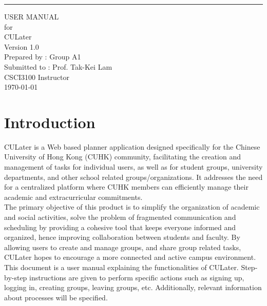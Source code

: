 \documentclass{scrreprt}
\date{}
\def\myversion{1.0 }
\begin{document}
\begin{flushright}
    \rule{16cm}{5pt}\vskip1cm
    \begin{bfseries}
        \Huge{USER MANUAL}\\
        \vspace{1.5cm}
        for\\
        \vspace{1.5cm}
        CULater\\
        \vspace{1.5cm}
        \LARGE{Version \myversion}\\
        \vspace{1.5cm}
        Prepared by : Group A1\\
        \vspace{1.5cm}
        Submitted to : Prof. Tak-Kei Lam\\CSCI3100 Instructor\\
        \vspace{1.5cm}
        \today\\
    \end{bfseries}
\end{flushright}

\newpage
\tableofcontents
\newpage
\chapter{Introduction}

CULater is a Web based planner application designed specifically for the Chinese University of Hong Kong (CUHK) community, facilitating the creation and management of tasks for individual users, as well as for student groups, university departments, and other school related groups/organizations. It addresses the need for a centralized platform where CUHK members can efficiently manage their academic and extracurricular commitments.\\

The primary objective of this product is to simplify the organization of academic and social activities, solve the problem of fragmented communication and scheduling by providing a cohesive tool that keeps everyone informed and organized, hence improving collaboration between students and faculty. By allowing users to create and manage groups, and share group related tasks, CULater hopes to encourage a more connected and active campus environment. \\

This document is a user manual explaining the functionalities of CULater. Step-by-step instructions are given to perform specific actions such as signing up, logging in, creating groups, leaving groups, etc. Additionally, relevant information about processes will be specified.
\end{document}
